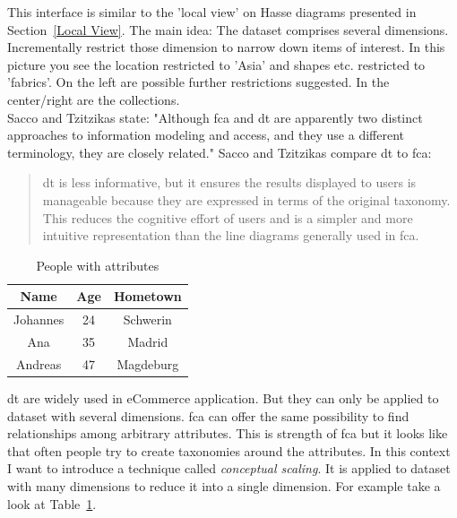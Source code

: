 \documentclass[11pt]{report}
\begin{document}
This interface is similar to the 'local view' on Hasse diagrams presented in Section~\ref{Local View}. The main idea: The dataset comprises several dimensions. Incrementally restrict those dimension to narrow down items of interest. In this picture you see the location restricted to 'Asia' and shapes etc. restricted to 'fabrics'. On the left are possible further restrictions suggested. In the center/right are the collections. \\

Sacco and Tzitzikas \cite{Sacco2009} state: "Although \acrshort{fca} and \acrshort{dt} are apparently two distinct approaches to information modeling and access, and they use a different terminology, they are closely related." Sacco and Tzitzikas \cite{Sacco2009} compare \acrshort{dt} to \acrshort{fca}:
\begin{quote}
\acrshort{dt} is less informative, but it ensures the results displayed to users is manageable because they are expressed in terms of the original taxonomy. This reduces the cognitive effort of users and is a simpler and more intuitive representation than the line diagrams generally used in \acrshort{fca}.
\end{quote}

\begin{table}[h]
\caption{People with attributes}
\label{table:manyvalued}
\centering

\def\arraystretch{1.2}%
\begin{tabular}{ c c c }
\hline
 Name & Age & Hometown \\
\hline
Johannes & 24 & Schwerin \\
Ana & 35 & Madrid \\
Andreas & 47 & Magdeburg \\
\hline
\end{tabular}
\end{table}

\acrshort{dt} are widely used in eCommerce application. But they can only be applied to dataset with several dimensions. \acrshort{fca} can offer the same possibility to find relationships among arbitrary attributes. This is strength of \acrshort{fca} but it looks like that often people try to create taxonomies around the attributes. In this context I want to introduce a technique called \textit{conceptual scaling}\cite{carpineto2004concept}. It is applied to dataset with many dimensions to reduce it into a single dimension. For example take a look at Table~\ref{table:manyvalued}. \\
\end{document}
